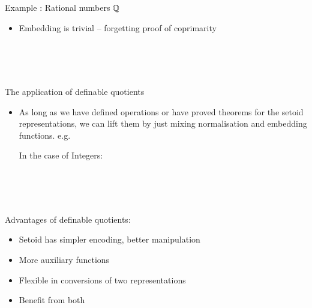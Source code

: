 \documentclass[11pt, mathserif,handout]{beamer}
\begin{document}
\begin{frame}[allowframebreaks,t]{Example : Rational numbers $\mathbb{Q}$}
\begin{itemize}
\item Embedding is trivial -- forgetting proof of coprimarity

\begin{code}
\\
\> \AgdaSymbol{:}   \<%
\\
\>   \AgdaSymbol{=} \AgdaSymbol{(} \AgdaSymbol{(} \AgdaSymbol{))}  \AgdaSymbol{(} \AgdaSymbol{)}\<%
\\
\end{code}

\end{itemize}

\end{frame}


\begin{frame}[allowframebreaks,t]{The application of definable quotients}

\begin{itemize}
\item As long as we have defined operations or have proved theorems
  for the setoid representations, we can lift them by just mixing normalisation and embedding functions.  e.g.\

In the case of Integers:

\begin{code}
\\
\> \AgdaSymbol{:} \AgdaSymbol{(} \AgdaSymbol{:}   \AgdaSymbol{)}    \<%
\\
\>  \AgdaSymbol{=} \AgdaFunction{[\_]}    \<%
\\
\end{code}


\end{itemize}

Advantages of definable quotients:

\begin{itemize}

\item Setoid has simpler encoding, better manipulation

\item More auxiliary functions

\item Flexible in conversions of two representations

\item Benefit from both

\end{itemize}

\end{frame}
\end{document}
